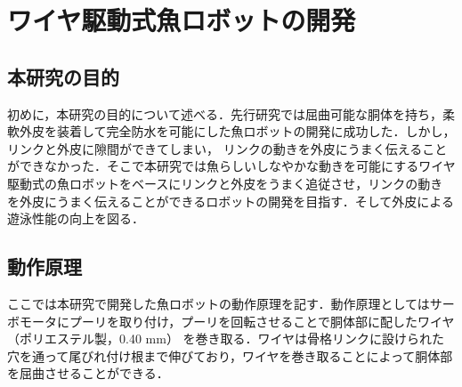 \newpage
\section{ワイヤ駆動式魚ロボットの開発}
\subsection{本研究の目的}
初めに，本研究の目的について述べる．先行研究では屈曲可能な胴体を持ち，柔軟外皮を装着して完全防水を可能にした魚ロボットの開発に成功した．しかし，リンクと外皮に隙間ができてしまい，
リンクの動きを外皮にうまく伝えることができなかった．そこで本研究では魚らしいしなやかな動きを可能にするワイヤ駆動式の魚ロボットをベースにリンクと外皮をうまく追従させ，リンクの動き
を外皮にうまく伝えることができるロボットの開発を目指す．そして外皮による遊泳性能の向上を図る．

\subsection{動作原理}
ここでは本研究で開発した魚ロボットの動作原理を記す．動作原理としてはサーボモータにプーリを取り付け，プーリを回転させることで胴体部に配したワイヤ（ポリエステル製，0.40 mm）
を巻き取る．ワイヤは骨格リンクに設けられた穴を通って尾びれ付け根まで伸びており，ワイヤを巻き取ることによって胴体部を屈曲させることができる．